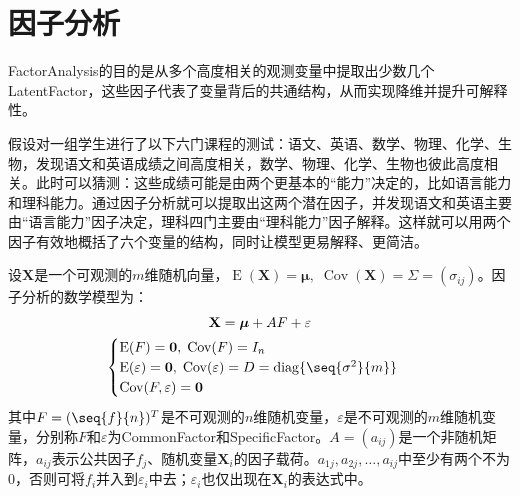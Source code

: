 \section{因子分析}
\gls{FactorAnalysis}的目的是从多个高度相关的观测变量中提取出少数几个\gls{LatentFactor}，这些因子代表了变量背后的共通结构，从而实现降维并提升可解释性。\par
假设对一组学生进行了以下六门课程的测试：语文、英语、数学、物理、化学、生物，发现语文和英语成绩之间高度相关，数学、物理、化学、生物也彼此高度相关。此时可以猜测：这些成绩可能是由两个更基本的“能力”决定的，比如语言能力和理科能力。通过因子分析就可以提取出这两个潜在因子，并发现语文和英语主要由“语言能力”因子决定，理科四门主要由“理科能力”因子解释。这样就可以用两个因子有效地概括了六个变量的结构，同时让模型更易解释、更简洁。
\begin{definition}
	设$\mathbf{X}$是一个可观测的$m$维随机向量，$\operatorname{E}(\mathbf{X})=\boldsymbol{\mu},\;\operatorname{Cov}(\mathbf{X})=\Sigma=(\sigma_{ij})$。因子分析的数学模型为：
	\begin{gather*}
		\mathbf{X}=\boldsymbol{\mu}+AF+\varepsilon \\
		\begin{cases}
			\operatorname{E}(F)=\mathbf{0},\;\operatorname{Cov}(F)=I_n \\
			\operatorname{E}(\varepsilon)=\mathbf{0},\;\operatorname{Cov}(\varepsilon)=D=\operatorname{diag}\{\seq{\sigma^2}{m}\} \\
			\operatorname{Cov}(F,\varepsilon)=\mathbf{0}
		\end{cases}
	\end{gather*}
	其中$F=(\seq{f}{n})^T$是不可观测的$n$维随机变量，$\varepsilon$是不可观测的$m$维随机变量，分别称$F$和$\varepsilon$为\gls{CommonFactor}和\gls{SpecificFactor}。$A=(a_{ij})$是一个非随机矩阵，$a_{ij}$表示公共因子$f_j$、随机变量$\mathbf{X}_i$的因子载荷。$a_{1j},a_{2j},\dots,a_{ij}$中至少有两个不为$0$，否则可将$f_i$并入到$\varepsilon_i$中去；$\varepsilon_i$也仅出现在$\mathbf{X}_i$的表达式中。
\end{definition}
